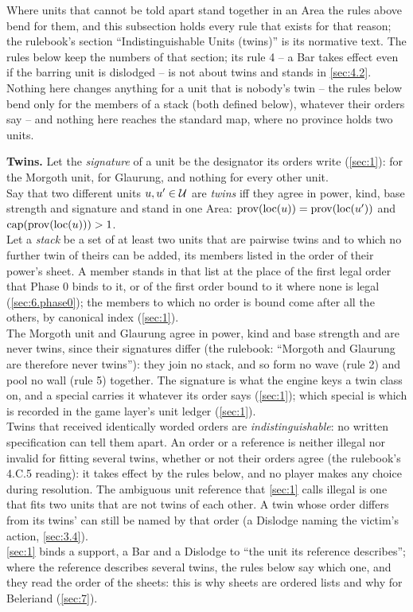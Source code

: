 \documentclass[12pt,a4paper]{article}
\begin{document}
Where units that cannot be told apart stand together in an Area the rules above bend for them, and this subsection holds every rule that exists for that reason; the rulebook's section ``Indistinguishable Units (twins)'' is its normative text.
The rules below keep the numbers of that section; its rule 4 -- a Bar takes effect even if the barring unit is dislodged -- is not about twins and stands in \cref{sec:4.2}.
Nothing here changes anything for a unit that is nobody's twin -- the rules below bend only for the members of a stack (both defined below), whatever their orders say -- and nothing here reaches the standard map, where no province holds two units.

\textbf{Twins.}
Let the \emph{signature} of a unit be the designator its orders write (\cref{sec:1}):  for the Morgoth unit,  for Glaurung, and nothing for every other unit.\\
Say that two different units $u, u' \in \mathcal{U}$ are \emph{twins} iff they agree in power, kind, base strength and signature and stand in one Area: $\operatorname{prov}(\operatorname{loc}(u)) = \operatorname{prov}(\operatorname{loc}(u'))$ and $\operatorname{cap}(\operatorname{prov}(\operatorname{loc}(u))) > 1$.\\
Let a \emph{stack} be a set of at least two units that are pairwise twins and to which no further twin of theirs can be added, its members listed in the order of their power's sheet.
A member stands in that list at the place of the first legal order that Phase 0 binds to it, or of the first order bound to it where none is legal (\cref{sec:6.phase0}); the members to which no order is bound come after all the others, by canonical index (\cref{sec:1}).\\
The Morgoth unit and Glaurung agree in power, kind and base strength and are never twins, since their signatures differ (the rulebook: ``Morgoth and Glaurung are therefore never twins''): they join no stack, and so form no wave (rule 2) and pool no wall (rule 5) together.
The signature is what the engine keys a twin class on, and a special carries it whatever its order says (\cref{sec:1}); which special is which is recorded in the game layer's unit ledger (\cref{sec:1}).\\
Twins that received identically worded orders are \emph{indistinguishable}: no written specification can tell them apart.
An order or a reference is neither illegal nor invalid for fitting several twins, whether or not their orders agree (the rulebook's 4.C.5 reading): it takes effect by the rules below, and no player makes any choice during resolution.
The ambiguous unit reference that \cref{sec:1} calls illegal is one that fits two units that are not twins of each other.
A twin whose order differs from its twins' can still be named by that order (a Dislodge naming the victim's action, \cref{sec:3.4}).\\
\cref{sec:1} binds a support, a Bar and a Dislodge to ``the unit its reference describes''; where the reference describes several twins, the rules below say which one, and they read the order of the sheets: this is why sheets are ordered lists and why  for Beleriand (\cref{sec:7}).
\end{document}
